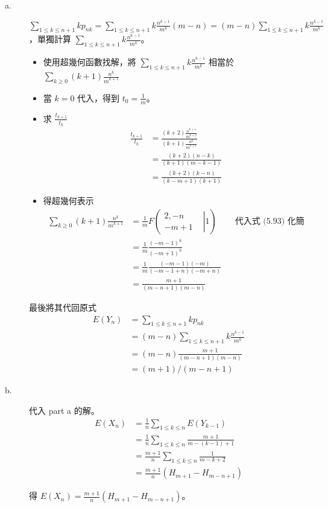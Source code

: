 \documentclass[11pt]{article}
\begin{document}
\begin{description}
	\item[a.] $\sum_{1 \le k \le n+1} k p_{nk} = \sum_{1 \le k \le n+1} k\frac{n^{\underline{k-1}}}{m^{\underline{k}}} (m-n) = (m-n) \sum_{1 \le k \le n+1} k\frac{n^{\underline{k-1}}}{m^{\underline{k}}}$，單獨計算 $\sum_{1 \le k \le n+1} k\frac{n^{\underline{k-1}}}{m^{\underline{k}}}$。
		\begin{itemize}
			\item 使用超幾何函數找解，將 $\sum_{1 \le k \le n+1} k\frac{n^{\underline{k-1}}}{m^{\underline{k}}}$ 相當於 $\sum_{k \ge 0} (k+1)\frac{n^{\underline{k}}}{m^{\underline{k+1}}}$
			\item 當 $k = 0$ 代入，得到 $t_0 = \frac{1}{m}$。
			\item 求 $\frac{t_{k+1}}{t_k}$
				\begin{align*}
					\frac{t_{k+1}}{t_k} &=
						\frac{(k+2) \frac{n^{\underline{k+1}}}{m^{\underline{k+2}}}}{(k+1) \frac{n^{\underline{k}}}{m^{\underline{k+1}}}} \\
							&= \frac{(k+2)(n-k)}{(k+1)(m-k-1)} \\
							&= \frac{(k+2)(k-n)}{(k-m+1)(k+1)}
				\end{align*}
			\item 得超幾何表示 
				\begin{align*}
					\sum_{k \ge 0} (k+1)\frac{n^{\underline{k}}}{m^{\underline{k+1}}} 
						&= \frac{1}{m} F \left (\left.\begin{matrix} 2, -n & \\  -m+1 & 
								\end{matrix}\right|1 \right ) 
								&& \text{代入式 (5.93) 化簡}\\
						&= \frac{1}{m} \frac{(-m-1)^{\overline{n}}}{(-m+1)^{\overline{n}}} \\
						&= \frac{1}{m} \frac{(-m-1)(-m)}{(-m-1+n)(-m+n)} \\
						&= \frac{m+1}{(m-n+1)(m-n)}
				\end{align*}
		\end{itemize}
		
		最後將其代回原式
		\begin{align*}
			E(Y_n) &= \sum_{1 \le k \le n+1} k p_{nk} \\
					&= (m-n) \sum_{1 \le k \le n+1} k\frac{n^{\underline{k-1}}}{m^{\underline{k}}} \\
					&= (m-n) \frac{m+1}{(m-n+1)(m-n)} \\
					&= (m+1)/(m-n+1)
		\end{align*}
	\item[b.] 代入 part a 的解。
		\begin{align*}
			E(X_n) &= \frac{1}{n} \sum_{1 \le k \le n} E(Y_{k-1}) \\
				&= \frac{1}{n} \sum_{1 \le k \le n} \frac{m+1}{m-(k-1)+1} \\
				&= \frac{m+1}{n} \sum_{1 \le k \le n} \frac{1}{m-k+2} \\
				&= \frac{m+1}{n} (H_{m+1} - H_{m-n+1})
		\end{align*}
		
		得 $E(X_n) = \frac{m+1}{n} (H_{m+1} - H_{m-n+1})$。
\end{description}
\end{document}
